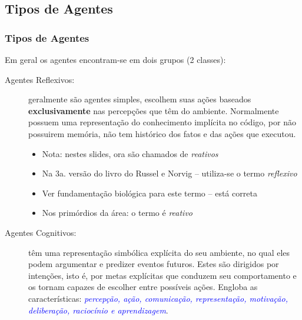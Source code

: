 \subsection{Tipos de Agentes}
\begin{frame} [allowframebreaks=0.9]
\frametitle{Tipos de Agentes}

Em geral os agentes encontram-se em  dois grupos (2 classes):

\begin{description}

 \item[Agentes Reflexivos:] geralmente são agentes simples, escolhem suas 
 ações baseados \textbf{exclusivamente} nas percepções que têm do ambiente. 
 Normalmente possuem uma representação do conhecimento implícita  no código, por não  possuirem  memória, não tem histórico dos fatos  e das ações que executou.
 
 \begin{itemize}
   \item Nota: nestes slides, ora são chamados de  \textit{reativos}
   
   \item Na 3a. versão do livro do Russel e Norvig -- utiliza-se o termo \textit{reflexivo}
   
   \item Ver fundamentação biológica para este termo -- está correta
   
   \item Nos primórdios da área: o termo é \textit{reativo} 
   
 \end{itemize}

 
\newpage

  \item[Agentes Cognitivos:]  têm uma representação simbólica explícita do seu ambiente, no qual eles podem argumentar e predizer eventos futuros. Estes são dirigidos por intenções, isto é, por metas explícitas que conduzem seu comportamento e os tornam capazes de escolher entre possíveis ações. 
  Engloba as características: \textit{\textcolor{blue}{percepção, ação, comunicação,  representação, 
  motivação, deliberação, raciocínio e aprendizagem}}. 

\end{description}

\end{frame}
